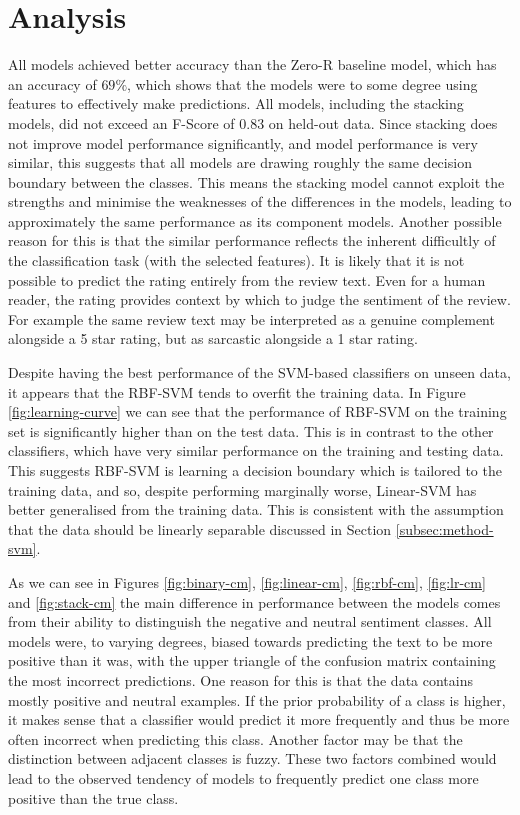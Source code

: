 \documentclass[11pt]{article}
\begin{document}
\section{Analysis}
All models achieved better accuracy than the Zero-R baseline model, which has an accuracy of $69 \%$, which shows that the models were to some degree using features to effectively make predictions. All models, including the stacking models, did not exceed an F-Score of 0.83 on held-out data. Since stacking does not improve model performance significantly, and model performance is very similar, this suggests that all models are drawing roughly the same decision boundary between the classes. This means the stacking model cannot exploit the strengths and minimise the weaknesses of the differences in the models, leading to approximately the same performance as its component models. Another possible reason for this is that the similar performance reflects the inherent difficultly of the classification task (with the selected features). It is likely that it is not possible to predict the rating entirely from the review text. Even for a human reader, the rating provides context by which to judge the sentiment of the review. For example the same review text may be interpreted as a genuine complement alongside a 5 star rating, but as sarcastic alongside a 1 star rating.

Despite having the best performance of the SVM-based classifiers on unseen data, it appears that the RBF-SVM tends to overfit the training data. In Figure \ref{fig:learning-curve} we can see that the performance of RBF-SVM on the training set is significantly higher than on the test data. This is in contrast to the other classifiers, which have very similar performance on the training and testing data. This suggests RBF-SVM is learning a decision boundary which is tailored to the training data, and so, despite performing marginally worse, Linear-SVM has better generalised from the training data. This is consistent with the assumption that the data should be linearly separable discussed in Section \ref{subsec:method-svm}.

As we can see in Figures \ref{fig:binary-cm}, \ref{fig:linear-cm}, \ref{fig:rbf-cm}, \ref{fig:lr-cm} and \ref{fig:stack-cm} the main difference in performance between the models comes from their ability to distinguish the negative and neutral sentiment classes. All models were, to varying degrees, biased towards predicting the text to be more positive than it was, with the upper triangle of the confusion matrix containing the most incorrect predictions. One reason for this is that the data contains mostly positive and neutral examples. If the prior probability of a class is higher, it makes sense that a classifier would predict it more frequently and thus be more often incorrect when predicting this class. Another factor may be that the distinction between adjacent classes is fuzzy. These two factors combined would lead to the observed tendency of models to frequently predict one class more positive than the true class.
\end{document}
